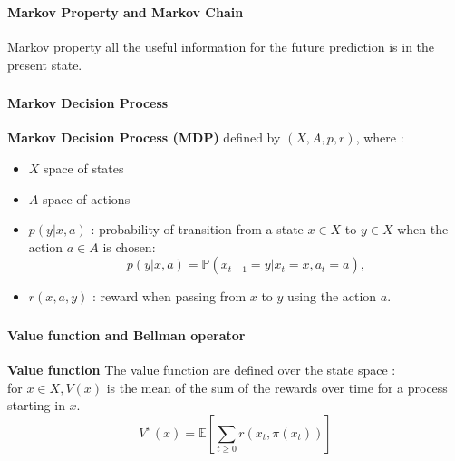 \documentclass[12pt,svgnames,table]{beamer}
\begin{document}
\begin{frame}
\frametitle{\insertsection}
\framesubtitle{\footnotesize Markov Property and Markov Chain}
\begin{block}{Markov property}
all the useful information for the future prediction is in the present state. 
\end{block}
\end{frame}


\begin{frame}
\frametitle{\insertsection}
\framesubtitle{\footnotesize Markov Decision Process}
\begin{block}{\textbf{Markov Decision Process (MDP)}}
defined by $(X,A,p,r)$, where :
\begin{itemize}
 \item $X$ space of states
 \item $A$ space of actions
 \item $p(y|x,a)$ : probability of transition from a state $x \in X$ to $y \in X$ when the action $a \in A$ is chosen:
 \begin{equation*}
 p(y|x,a) = \mathbb{P}(x_{t+1}=y|x_t=x,a_t=a),
 \end{equation*}
 \item $r(x,a,y)$ : reward when passing from $x$ to $y$ using the action $a$.
\end{itemize}
\end{block}
\end{frame}

\begin{frame}
\frametitle{\insertsection}
\framesubtitle{\footnotesize Value function and Bellman operator}
\begin{block}{\textbf{Value function}}
The value function are defined over the state space : \\
for $x \in X, V(x)$ is the mean of the sum of the rewards over time for a process starting in $x$.
\[ V^{\pi}(x) = \mathbb{E} [ \sum_{t \geqslant 0} r(x_t,\pi(x_t))  ] \]
\end{block}
\end{frame}
\end{document}

